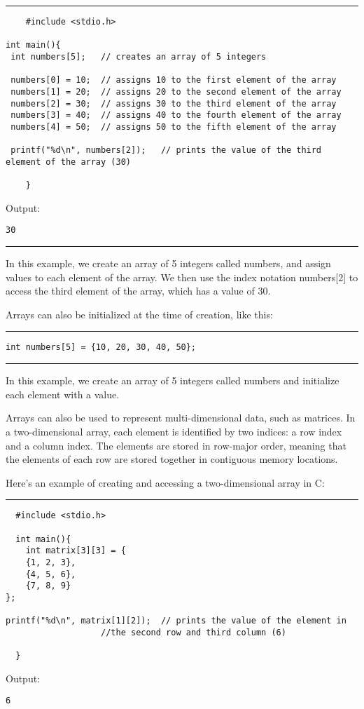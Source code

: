 \documentclass[a4paper]{article}
\begin{document}
\noindent\rule{\textwidth}{0.5pt}
\begin{verbatim}
	#include <stdio.h>

int main(){
 int numbers[5];   // creates an array of 5 integers

 numbers[0] = 10;  // assigns 10 to the first element of the array
 numbers[1] = 20;  // assigns 20 to the second element of the array
 numbers[2] = 30;  // assigns 30 to the third element of the array
 numbers[3] = 40;  // assigns 40 to the fourth element of the array
 numbers[4] = 50;  // assigns 50 to the fifth element of the array

 printf("%d\n", numbers[2]);   // prints the value of the third element of the array (30)

	}
\end{verbatim}
Output:
\begin{verbatim}
30
\end{verbatim}

\noindent\rule{\textwidth}{0.5pt}
In this example, we create an array of 5 integers called numbers, and assign
values to each element of the array. We then use the index notation numbers[2]
to access the third element of the array, which has a value of 30.


Arrays can also be initialized at the time of creation, like this:

\noindent\rule{\textwidth}{0.5pt}
\begin{verbatim}
int numbers[5] = {10, 20, 30, 40, 50};
\end{verbatim}

\noindent\rule{\textwidth}{0.5pt}
In this example, we create an array of 5 integers called numbers and initialize
each element with a value.


Arrays can also be used to represent multi-dimensional data, such as
matrices. In a two-dimensional array, each element is identified by two indices:
a row index and a column index. The elements are stored in row-major order,
meaning that the elements of each row are stored together in contiguous memory
locations.


Here's an example of creating and accessing a two-dimensional array in C:

\noindent\rule{\textwidth}{0.5pt}
\begin{verbatim}
  #include <stdio.h>

  int main(){
    int matrix[3][3] = {
    {1, 2, 3},
    {4, 5, 6},
    {7, 8, 9}
};

printf("%d\n", matrix[1][2]);  // prints the value of the element in
			       //the second row and third column (6)

  }
\end{verbatim}
Output:
\begin{verbatim}
6
\end{verbatim}
\end{document}
